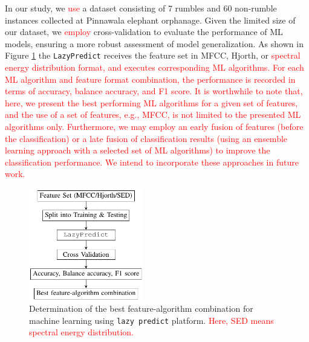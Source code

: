 \documentclass[applsci,article,accept,moreauthors,pdftex]{Definitions/mdpi}
\begin{document}
In our study, we \textcolor{red}{use} a dataset consisting of 7 rumbles and 60 non-rumble instances collected at Pinnawala elephant orphanage. Given the limited size of our dataset, we \textcolor{red}{ employ} cross-validation to evaluate the performance of ML models, ensuring a more robust assessment of model generalization. As shown in Figure \ref{fig_ML} the {\tt LazyPredict} receives the feature set in MFCC, Hjorth, or \textcolor{red}{spectral energy distribution format, and executes corresponding ML algorithms. For each ML algorithm and feature format combination, the performance is recorded in terms of accuracy, balance accuracy, and F1 score. It is worthwhile to note that, here, we present the best performing ML algorithms for a given set of features, and the use of a set of features, e.g., MFCC, is not limited to the presented ML algorithms only. Furthermore, we may employ an early fusion of features (before the classification) or a late fusion of classification results (using an ensemble learning approach with a selected set of ML algorithms) to improve the classification performance. We intend to incorporate these approaches in future work.}
\begin{figure}[t!]
	\centering   \includegraphics[width=5cm]{figures/algo}
	\caption{Determination of the best feature-algorithm combination for machine learning using {\tt lazy predict} platform. \textcolor{red}{Here, SED means spectral energy distribution.}}
	\label{fig_ML}
\end{figure}
\end{document}
